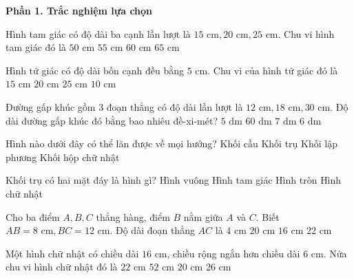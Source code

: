 \textbf{Phần 1. Trắc nghiệm lựa chọn}

\begin{ex} %
Hình tam giác có độ dài ba cạnh lần lượt là $15\text{ cm}, 20\text{ cm}, 25\text{ cm}$. Chu vi hình tam giác đó là
\choice
{$50\text{ cm}$}
{$55\text{ cm}$}
{\True $60\text{ cm}$}
{$65\text{ cm}$}
\end{ex}

\begin{ex} %
Hình tứ giác có độ dài bốn cạnh đều bằng $5\text{ cm}$. Chu vi của hình tứ giác đó là
\choice
{$15\text{ cm}$}
{\True $20\text{ cm}$}
{$25\text{ cm}$}
{$10\text{ cm}$}
\end{ex}

\begin{ex} %
Đường gấp khúc gồm $3$ đoạn thẳng có độ dài lần lượt là $12\text{ cm}, 18\text{ cm}, 30\text{ cm}$. Độ dài đường gấp khúc đó bằng bao nhiêu đề-xi-mét?
\choice
{$5\text{ dm}$}
{$60\text{ dm}$}
{$7\text{ dm}$}
{\True $6\text{ dm}$}
\end{ex}

\begin{ex} %
Hình nào dưới đây có thể lăn được về mọi hướng?
\choice
{\True Khối cầu}
{Khối trụ}
{Khối lập phương}
{Khối hộp chữ nhật}
\end{ex}

\begin{ex} %
Khối trụ có hai mặt đáy là hình gì?
\choice
{Hình vuông}
{Hình tam giác}
{\True Hình tròn}
{Hình chữ nhật}
\end{ex}

\begin{ex} %
Cho ba điểm $A, B, C$ thẳng hàng, điểm $B$ nằm giữa $A$ và $C$. Biết $AB = 8\text{ cm}, BC = 12\text{ cm}$. Độ dài đoạn thẳng $AC$ là
\choice
{$4\text{ cm}$}
{\True $20\text{ cm}$}
{$16\text{ cm}$}
{$22\text{ cm}$}
\end{ex}

\begin{ex} %
Một hình chữ nhật có chiều dài $16\text{ cm}$, chiều rộng ngắn hơn chiều dài $6\text{ cm}$. Nửa chu vi hình chữ nhật đó là
\choice
{$22\text{ cm}$}
{$52\text{ cm}$}
{$20\text{ cm}$}
{\True $26\text{ cm}$}
\end{ex}

